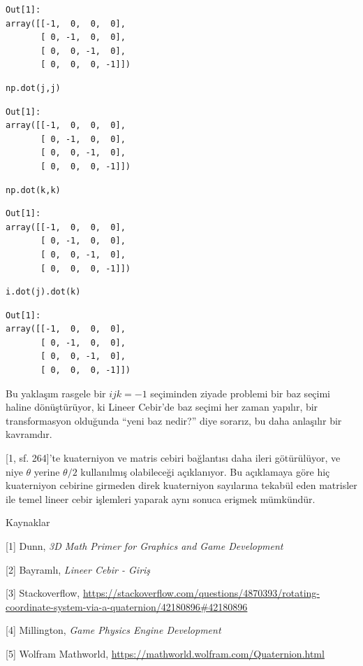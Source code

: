 \documentclass[12pt,fleqn]{article}\usepackage{../../common}
\begin{document}
\begin{verbatim}
Out[1]: 
array([[-1,  0,  0,  0],
       [ 0, -1,  0,  0],
       [ 0,  0, -1,  0],
       [ 0,  0,  0, -1]])
\end{verbatim}

\begin{verbatim}
np.dot(j,j)
\end{verbatim}

\begin{verbatim}
Out[1]: 
array([[-1,  0,  0,  0],
       [ 0, -1,  0,  0],
       [ 0,  0, -1,  0],
       [ 0,  0,  0, -1]])
\end{verbatim}

\begin{verbatim}
np.dot(k,k)
\end{verbatim}

\begin{verbatim}
Out[1]: 
array([[-1,  0,  0,  0],
       [ 0, -1,  0,  0],
       [ 0,  0, -1,  0],
       [ 0,  0,  0, -1]])
\end{verbatim}

\begin{verbatim}
i.dot(j).dot(k)
\end{verbatim}

\begin{verbatim}
Out[1]: 
array([[-1,  0,  0,  0],
       [ 0, -1,  0,  0],
       [ 0,  0, -1,  0],
       [ 0,  0,  0, -1]])
\end{verbatim}

Bu yaklaşım rasgele bir $ijk=-1$ seçiminden ziyade problemi bir baz seçimi
haline dönüştürüyor, ki Lineer Cebir'de baz seçimi her zaman yapılır, bir
transformasyon olduğunda ``yeni baz nedir?'' diye sorarız, bu daha anlaşılır
bir kavramdır.

[1, sf. 264]'te kuaterniyon ve matris cebiri bağlantısı daha ileri götürülüyor,
ve niye $\theta$ yerine $\theta / 2$ kullanılmış olabileceği açıklanıyor.  Bu
açıklamaya göre hiç kuaterniyon cebirine girmeden direk kuaterniyon sayılarına
tekabül eden matrisler ile temel lineer cebir işlemleri yaparak aynı sonuca
erişmek mümkündür.

Kaynaklar

[1] Dunn, {\em 3D Math Primer for Graphics and Game Development}

[2] Bayramlı, {\em Lineer Cebir - Giriş}

[3] Stackoverflow,
    \url{https://stackoverflow.com/questions/4870393/rotating-coordinate-system-via-a-quaternion/42180896#42180896}

[4] Millington, {\em Game Physics Engine Development}

[5] Wolfram Mathworld,
    \url{https://mathworld.wolfram.com/Quaternion.html}
\end{document}
